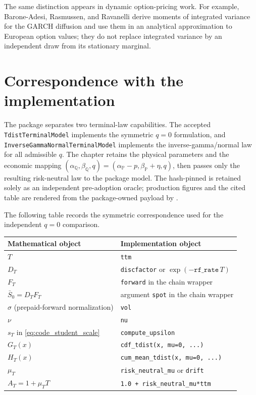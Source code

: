 \documentclass[11pt,a4paper]{article}
\newcommand{\cdf}{G}
\begin{document}
The same distinction appears in dynamic option-pricing work.  For example,
Barone-Adesi, Rasmussen, and Ravanelli
\cite{BaroneAdesiRasmussenRavanelli2005} derive moments of integrated variance
for the GARCH diffusion and use them in an analytical approximation to
European option values; they do not replace integrated variance by an
independent draw from its stationary marginal.

\section{Correspondence with the implementation}

The package separates two terminal-law capabilities.  The accepted
\texttt{TdistTerminalModel} implements the symmetric $q=0$ formulation, and
\texttt{InverseGammaNormalTerminalModel} implements the inverse-gamma/normal
law for all admissible $q$.  The chapter retains the physical parameters and
the economic mapping
$(\alpha_{\mathbb Q},\beta_{\mathbb Q},q)
=(\alpha_{\mathbb P}-p,\beta_{\mathbb P}+\eta,q)$, then passes only the
resulting risk-neutral law to the package model.  The hash-pinned
 is retained solely as an independent
pre-adoption oracle; production figures and the cited table are rendered from
the package-owned payload by
.

The following table records the symmetric correspondence used for the
independent $q=0$ comparison.
\begin{center}
\begin{tabular}{@{}ll@{}}
\toprule
Mathematical object & Implementation object \\
\midrule
$T$ & \texttt{ttm} \\
$D_T$ & \texttt{discfactor} or $\exp(-\texttt{rf\_rate}\,T)$ \\
$F_T$ & \texttt{forward} in the chain wrapper \\
$\bar S_0=D_TF_T$ & argument \texttt{spot} in the chain wrapper \\
$\sigma$ (prepaid-forward normalization) & \texttt{vol} \\
$\nu$ & \texttt{nu} \\
$s_T$ in \eqref{eq:code_student_scale} & \texttt{compute\_upsilon} \\
$\cdf_T(x)$ & \texttt{cdf\_tdist(x, mu=0, ...)} \\
$H_T(x)$ & \texttt{cum\_mean\_tdist(x, mu=0, ...)} \\
$\mu_T$ & \texttt{risk\_neutral\_mu} or \texttt{drift} \\
$A_T=1+\mu_TT$ & \texttt{1.0 + risk\_neutral\_mu*ttm} \\
\bottomrule
\end{tabular}
\end{center}
\end{document}
